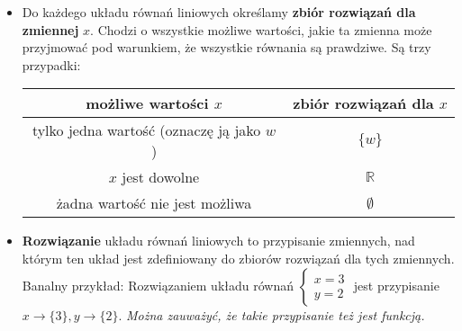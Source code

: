 \documentclass{article}
\theoremstyle{remark}
\begin{document}
\begin{itemize}
\begin{align*}
\begin{array}{lllll}
      3x &+& 2y &=& 5\\
      4x &+& 7y &=& 3
    \end{array}
    \right. \\
    &\left\{
    \begin{array}{lllllll}
      \tfrac12x &+& 2y &-&z &=& 5\\
       && 23y &-&77z &=& 100\\
      4x &+& \tfrac74y &+&9z &=& 3
    \end{array}
    \right.
  \end{align*}
  Oczywiście, układ równań jest zdefiniowany nad tymi zmiennymi, nad
  którymi są zdefiniowane jego równania.
  Ale, \textit{możemy} też sobie powiedzieć,
  że pewien konkretny układ jest nad innymi zmiennymi.
  Wtedy powiemy sobie, że każde z jego równań również
  jest nad tymi zmiennymi.
  \item Do każdego układu równań liniowych określamy \textbf{zbiór rozwiązań
  dla zmiennej} $x$.
  Chodzi o wszystkie możliwe wartości, jakie ta zmienna może przyjmować
  pod warunkiem, że wszystkie równania są prawdziwe.
  Są trzy przypadki:
  \begin{center}
    \begin{tabular}{|c|c|}
      \hline
      możliwe wartości $x$ &zbiór rozwiązań dla $x$\\
      \hline\hline
      tylko jedna wartość (oznaczę ją jako $w$) & $\{w\}$\\
      \hline
      $x$ jest dowolne & $\mathbb R$\\
      \hline
      żadna wartość nie jest możliwa & $\emptyset$\\
      \hline
    \end{tabular}
  \end{center}

  \item \textbf{Rozwiązanie}  układu równań liniowych to
  przypisanie zmiennych, nad którym ten układ jest zdefiniowany do
  zbiorów rozwiązań dla tych zmiennych. Banalny przykład:
  Rozwiązaniem układu równań $
    \left\{
      \begin{array}{l}
        x=3\\
        y=2
      \end{array}
    \right.$ jest przypisanie $x \to \{3\}, y \to \{2\}$.
  \textit{Można zauważyć, że takie przypisanie też jest funkcją.}


\end{itemize}
\end{document}
